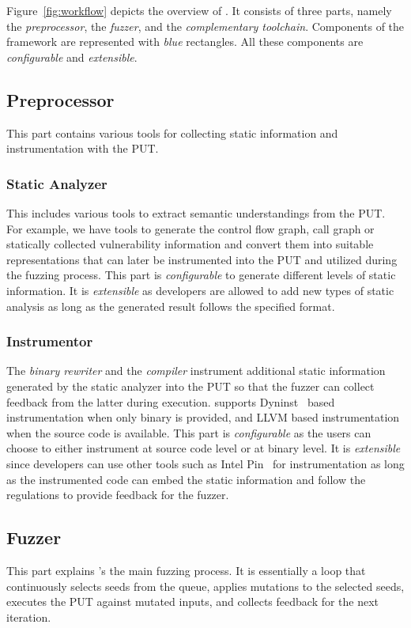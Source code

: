 Figure~\ref{fig:workflow} depicts the overview of {\FOT}.
It consists of three parts, namely the \emph{preprocessor}, the \emph{fuzzer}, and the \emph{complementary toolchain}.
Components of the framework are represented with \emph{blue} rectangles. All these components are \textit{configurable} and \textit{extensible}.


\subsection{Preprocessor}
This part contains various tools for collecting static information and instrumentation with the PUT.


\subsubsection{Static Analyzer}\label{sec:static_analysis}
This includes various tools to extract semantic understandings from the PUT.
For example, we have tools to generate the control flow graph, call graph or statically collected vulnerability information and convert them into suitable representations that can later be instrumented into the PUT and utilized during the fuzzing process.
This part is \textit{configurable} to generate different levels of static information. It is \textit{extensible} as developers are allowed to add new types of static analysis as long as the generated result follows the specified format.


\subsubsection{Instrumentor}
The \emph{binary rewriter} and the \emph{compiler} instrument additional static information generated by the static analyzer into the PUT so that the fuzzer can collect feedback from the latter during execution.
{\FOT} supports Dyninst~\cite{dyninst} based instrumentation when only binary is provided, and LLVM based instrumentation when the source code is available.
This part is \textit{configurable} as the users can choose to either instrument at source code level or at binary level.
It is \textit{extensible} since developers can use other tools such as Intel Pin~\cite{pin} for instrumentation as long as the instrumented code can embed the static information and follow the regulations to provide feedback for the fuzzer.

\subsection{Fuzzer}
This part explains {\FOT}'s the main fuzzing process. 
It is essentially a loop that continuously selects seeds from the queue, applies mutations to the selected seeds, executes the PUT against mutated inputs, and collects feedback for the next iteration.

